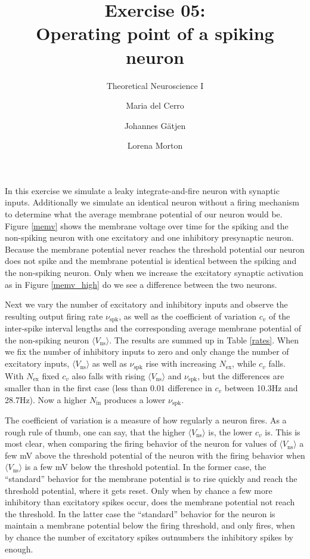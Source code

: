 \documentclass{scrartcl}
\title{Exercise 05:\\Operating point of a spiking neuron}
\subtitle{Theoretical Neuroscience I}
\author{Maria del Cerro \and Johannes G\"atjen \and Lorena Morton}
\begin{document}
\maketitle

In this exercise we simulate a leaky integrate-and-fire neuron with synaptic inputs. Additionally we simulate an identical neuron without a firing mechanism  to determine what the average membrane potential of our neuron would be. Figure \ref{memv} shows the membrane voltage over time for the spiking and the non-spiking neuron with one excitatory and one inhibitory presynaptic neuron. Because the membrane potential never reaches the threshold potential our neuron does not spike and the membrane potential is identical between the spiking and the non-spiking neuron. Only when we increase the excitatory synaptic activation as in Figure \ref{memv_high} do we see a difference between the two neurons.

Next we vary the number of excitatory and inhibitory inputs and observe the resulting output firing rate $\nu_\mathrm{spk}$, as well as the coefficient of variation $c_v$ of the inter-spike interval lengths and the corresponding average membrane potential of the non-spiking neuron $\langle V_\mathrm{ns}\rangle $. The results are summed up in Table \ref{rates}. When we fix the number of inhibitory inputs to zero and only change the number of excitatory inputs, $\langle V_\mathrm{ns}\rangle$ as well as $\nu_\mathrm{spk}$ rise with increasing $N_\mathrm{ex}$, while $c_v$ falls. With $N_\mathrm{ex}$ fixed $c_v$ also falls with rising $\langle V_\mathrm{ns}\rangle$ and $\nu_\mathrm{spk}$, but the differences are smaller than in the first case (less than $0.01$ difference in $c_v$ between 10.3\si{Hz} and 28.7\si{Hz}). Now a higher $N_\mathrm{in}$ produces a lower $\nu_\mathrm{spk}$.

The coefficient of variation is a measure of how regularly a neuron fires. As a rough rule of thumb, one can say, that the higher $\langle V_\mathrm{ns}\rangle$ is, the lower $c_v$ is. This is most clear, when comparing the firing behavior of the neuron for values of $\langle V_\mathrm{ns}\rangle$ a few \si{mV} above the threshold potential of the neuron with the firing behavior when $\langle V_\mathrm{ns}\rangle$ is a few \si{mV} below the threshold potential. In the former case, the ``standard'' behavior for the membrane potential is to rise quickly and reach the threshold potential, where it gets reset. Only when by chance a few more inhibitory than excitatory spikes occur, does the membrane potential not reach the threshold. In the latter case the ``standard'' behavior for the neuron is maintain a membrane potential below the firing threshold, and only fires, when by chance the number of excitatory spikes outnumbers the inhibitory spikes by enough.
\end{document}
